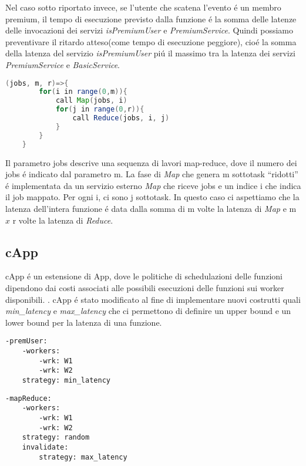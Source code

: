 \documentclass[../../main.tex]{subfiles}
\begin{document}
Nel caso sotto riportato invece, se l'utente che scatena l'evento é un membro premium, il tempo di esecuzione previsto dalla funzione é la somma delle latenze delle invocazioni dei servizi \textit{isPremiumUser} e \textit{PremiumService}.
Quindi possiamo preventivare il ritardo atteso(come tempo di esecuzione peggiore), cioé la somma della latenza del servizio \textit{isPremiumUser} piú il massimo tra la latenza dei servizi \textit{PremiumService} e \textit{BasicService}.

\begin{lstlisting}[language=Java, caption=Funzione con logica Map-Reduce,label={lst:3}]
    (jobs, m, r)=>{
        for(i in range(0,m)){
            call Map(jobs, i)
            for(j in range(0,r)){
                call Reduce(jobs, i, j)
            }
        }
    }
\end{lstlisting}
Il parametro jobs descrive una sequenza di lavori map-reduce, dove il numero dei jobs é indicato dal parametro m.
La fase di \textit{Map} che genera m sottotask ``ridotti'' é implementata da un servizio esterno \textit{Map} che riceve jobs e un indice i che indica il job mappato.
Per ogni i, ci sono j sottotask.
In questo caso ci aspettiamo che la latenza dell'intera funzione é data dalla somma di m volte la latenza di \textit{Map} e m $x$ r volte la latenza di \textit{Reduce}.\\
\subsection{cApp}
\label{cApp}
cApp é un estensione di App, dove le politiche di schedulazioni delle funzioni dipendono dai costi associati alle possibili esecuzioni delle funzioni sui worker disponibili.
\autocite{de2020allocation}.
cApp é stato modificato al fine di implementare nuovi costrutti quali \textit{min\_latency} e \textit{max\_latency} che ci permettono di definire un upper bound e un lower bound per la latenza di una funzione.
\begin{multicols}{2}
    \begin{lstlisting}[caption={cAPP for Listing \ref{lst:1} e \ref{lst:2}},label={lst:4}]
-premUser:
    -workers:
        -wrk: W1
        -wrk: W2
    strategy: min_latency
    \end{lstlisting}
    \columnbreak
    \begin{lstlisting}[caption={cApp for Listing~\ref{lst:3}}, label={lst:5}]
-mapReduce:
    -workers:
        -wrk: W1
        -wrk: W2
    strategy: random
    invalidate:
        strategy: max_latency
    \end{lstlisting}
\end{multicols}
\end{document}
